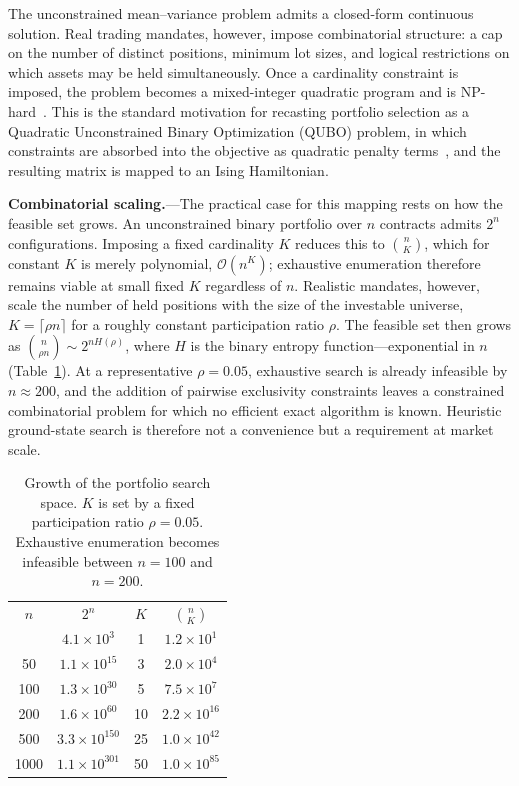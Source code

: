 \documentclass[aps, reprint, prl, twocolumn, superscriptaddress,amsmath,amssymb,noeprint]{revtex4-2}
\begin{document}
The unconstrained mean--variance problem admits a closed-form continuous
solution.  Real trading mandates, however, impose combinatorial
structure: a cap on the number of distinct positions, minimum lot sizes,
and logical restrictions on which assets may be held simultaneously.
Once a cardinality constraint is imposed, the problem becomes a
mixed-integer quadratic program and is
NP-hard~\cite{bienstock1996,bertsimas2009}.  This is the standard
motivation for recasting portfolio selection as a Quadratic Unconstrained
Binary Optimization (QUBO) problem, in which constraints are absorbed
into the objective as quadratic penalty
terms~\cite{lucas2014,glover2019}, and the resulting matrix is mapped to
an Ising Hamiltonian.

\textbf{Combinatorial scaling.}---The practical case for this mapping
rests on how the feasible set grows.  An unconstrained binary portfolio
over $n$ contracts admits $2^n$ configurations.  Imposing a fixed
cardinality $K$ reduces this to $\binom{n}{K}$, which for constant $K$ is
merely polynomial, $\mathcal{O}(n^K)$; exhaustive enumeration therefore
remains viable at small fixed $K$ regardless of $n$.  Realistic mandates,
however, scale the number of held positions with the size of the
investable universe, $K = \lceil \rho n \rceil$ for a roughly constant
participation ratio $\rho$.  The feasible set then grows as
$\binom{n}{\rho n} \sim 2^{n H(\rho)}$, where $H$ is the binary entropy
function---exponential in $n$ (Table~\ref{tab:scaling}).  At a
representative $\rho = 0.05$, exhaustive search is already infeasible by
$n \approx 200$, and the addition of pairwise exclusivity constraints
leaves a constrained combinatorial problem for which no efficient exact
algorithm is known.  Heuristic ground-state search is therefore not a
convenience but a requirement at market scale.

\begin{table}[b]
\caption{\label{tab:scaling}Growth of the portfolio search space.  $K$ is
set by a fixed participation ratio $\rho = 0.05$.  Exhaustive enumeration
becomes infeasible between $n = 100$ and $n = 200$.}
\begin{ruledtabular}
\begin{tabular}{cccc}
$n$ & $2^n$ & $K$ & $\binom{n}{K}$ \\
\colrule
12   & $4.1\times10^{3}$   & 1  & $1.2\times10^{1}$ \\
50   & $1.1\times10^{15}$  & 3  & $2.0\times10^{4}$ \\
100  & $1.3\times10^{30}$  & 5  & $7.5\times10^{7}$ \\
200  & $1.6\times10^{60}$  & 10 & $2.2\times10^{16}$ \\
500  & $3.3\times10^{150}$ & 25 & $1.0\times10^{42}$ \\
1000 & $1.1\times10^{301}$ & 50 & $1.0\times10^{85}$ \\
\end{tabular}
\end{ruledtabular}
\end{table}
\end{document}
